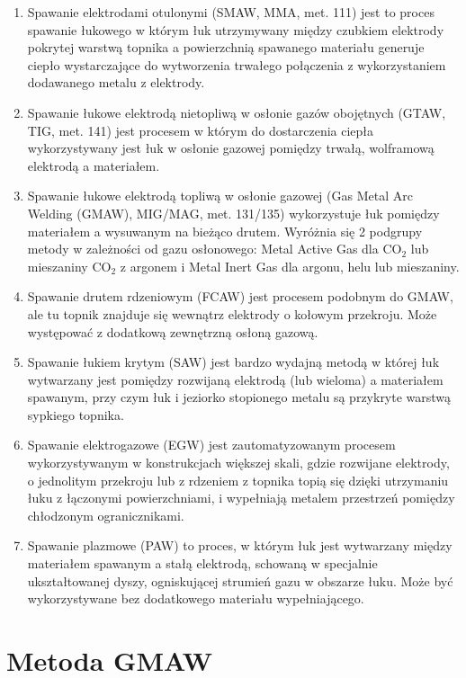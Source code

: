 \documentclass{mwart}
\begin{document}
\begin{enumerate}
    \item Spawanie elektrodami otulonymi (SMAW, MMA, met. 111) jest to proces spawanie łukowego w którym łuk utrzymywany między czubkiem elektrody pokrytej warstwą topnika a powierzchnią spawanego materiału generuje ciepło wystarczające do wytworzenia trwałego połączenia z wykorzystaniem dodawanego metalu z elektrody.
    \item Spawanie łukowe elektrodą nietopliwą w osłonie gazów obojętnych (GTAW, TIG, met. 141) jest procesem w którym do dostarczenia ciepła wykorzystywany jest łuk w osłonie gazowej pomiędzy trwałą, wolframową elektrodą a materiałem.
    \item Spawanie łukowe elektrodą topliwą w osłonie gazowej (Gas Metal Arc Welding (GMAW), MIG/MAG, met. 131/135) wykorzystuje łuk pomiędzy materiałem a wysuwanym na bieżąco drutem. Wyróżnia się 2 podgrupy metody w zależności od gazu osłonowego: Metal Active Gas dla CO$_2$ lub mieszaniny CO$_2$ z argonem i Metal Inert Gas dla argonu, helu lub mieszaniny.
    \item Spawanie drutem rdzeniowym (FCAW) jest procesem podobnym do GMAW, ale tu topnik znajduje się wewnątrz elektrody o kołowym przekroju. Może występować z dodatkową zewnętrzną osłoną gazową.
    \item Spawanie łukiem krytym (SAW) jest bardzo wydajną metodą w której łuk wytwarzany jest pomiędzy rozwijaną elektrodą (lub wieloma) a materiałem spawanym, przy czym łuk i jeziorko stopionego metalu są przykryte warstwą sypkiego topnika.
    \item Spawanie elektrogazowe (EGW) jest zautomatyzowanym procesem wykorzystywanym w konstrukcjach większej skali, gdzie rozwijane elektrody, o jednolitym przekroju lub z rdzeniem z topnika topią się dzięki utrzymaniu łuku z łączonymi powierzchniami, i wypełniają metalem przestrzeń pomiędzy chłodzonym ogranicznikami.
    \item Spawanie plazmowe (PAW) to proces, w którym łuk jest wytwarzany między materiałem spawanym a stałą elektrodą, schowaną w specjalnie ukształtowanej dyszy, ogniskującej strumień gazu w obszarze łuku. Może być wykorzystywane bez dodatkowego materiału wypełniającego.
\end{enumerate}

\section{Metoda GMAW}
\end{document}
